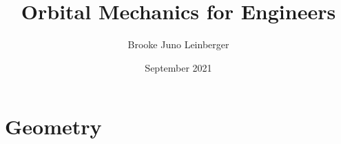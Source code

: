 \documentclass{report}
\title{Orbital Mechanics for Engineers}
\author{Brooke Juno Leinberger}
\date{September 2021}
\begin{document}
\maketitle

\chapter{Geometry}


\newpage

\normalsize
\end{document}
